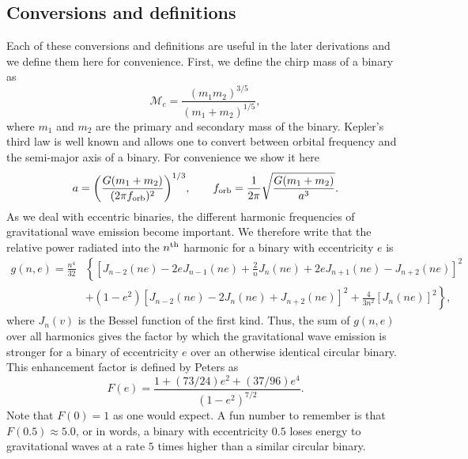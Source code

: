\documentclass[twocolumn]{aastex63}
\begin{document}
\subsection{Conversions and definitions}
Each of these conversions and definitions are useful in the later derivations and we define them here for convenience. First, we define the chirp mass of a binary as 
\begin{equation}\label{eq:chirpmass}
    \mathcal{M}_c = \frac{(m_1 m_2)^{3/5}}{(m_1 + m_2)^{1/5}},
\end{equation}
where $m_1$ and $m_2$ are the primary and secondary mass of the binary. Kepler's third law is well known and allows one to convert between orbital frequency and the semi-major axis of a binary. For convenience we show it here
\begin{equation}\label{eq:kepler3rd}
    a = \qty(\frac{G(m_1 + m_2)}{(2 \pi f_{\rm orb})^{2}})^{1/3},\qquad f_{\rm orb} = \frac{1}{2 \pi} \sqrt{\frac{G(m_1 + m_2)}{a^3}}.
\end{equation}
As we deal with eccentric binaries, the different harmonic frequencies of gravitational wave emission become important. We therefore write that the relative power radiated into the $n^{\rm th}$ harmonic for a binary with eccentricity $e$ is \citep[][Eq.\,20]{Peters+1963}
\begin{equation}\label{eq:g(n,e)}
    \begin{aligned}
        g(n, e) = \frac{n^{4}}{32} & \left\{ \left[ J_{n-2}(n e)-2 e J_{n-1}(n e)+\frac{2}{n} J_{n}(n e)+2 e J_{n+1}(n e)-J_{n+2}(n e)\right]^{2}\right.\\
        &\left.+\left(1-e^{2}\right)\left[J_{n-2}(n e)-2 J_{n}(n e)+J_{n+2}(n e)\right]^{2}+\frac{4}{3 n^{2}}\left[J_{n}(n e)\right]^{2}\right\},
    \end{aligned}
\end{equation}
where $J_{n}(v)$ is the Bessel function of the first kind. Thus, the sum of $g(n, e)$ over all harmonics gives the factor by which the gravitational wave emission is stronger for a binary of eccentricity $e$ over an otherwise identical circular binary. This enhancement factor is defined by Peters as \citep[][Eq.\,17]{Peters+1963}
\begin{equation}\label{eq:eccentricity_enhancement_factor}
    F(e) = \frac{1 + (73 / 24) e^2 + (37 / 96) e^4}{(1 - e^2)^{7/2}}.
\end{equation}
Note that $F(0) = 1$ as one would expect. A fun number to remember is that $F(0.5) \approx 5.0$, or in words, a binary with eccentricity $0.5$ loses energy to gravitational waves at a rate $5$ times higher than a similar circular binary.
\end{document}
